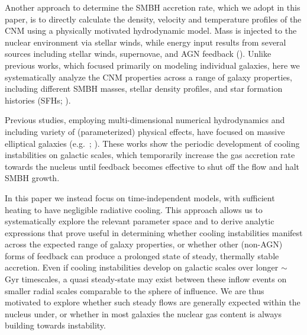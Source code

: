 \documentclass[usenatbib,fleqn]{mn2e}
\begin{document}

Another approach to determine the SMBH accretion rate, which we adopt
in this paper, is to directly calculate the density, velocity and
temperature profiles of the CNM using a physically motivated
hydrodynamic model.  Mass is injected to the nuclear environment via
stellar winds, while energy input results from several sources
including stellar winds, supernovae, and AGN feedback
(\citealt{Quataert:2004a,De-ColleGuillochon+:2012a,ShcherbakovWong+:2014a}).
Unlike previous works, which focused primarily on modeling individual galaxies, here
we systematically analyze the CNM properties across a range of galaxy properties, including different SMBH masses, stellar density profiles, and
star formation histories (SFHs; \citealt{WangMerritt:2004a}).

Previous studies, employing multi-dimensional numerical hydrodynamics and
including variety of (parameterized) physical effects, have focused on
massive elliptical galaxies (e.g.~\citealt{Ciotti&Ostriker07};
\citealt{Ciotti+10}).  These works show the periodic
development of cooling instabilities on galactic scales, which
temporarily increase the gas accretion rate towards the nucleus until
feedback becomes effective to shut off the flow and halt
SMBH growth.  

In this paper we instead focus on time-independent models, with
sufficient heating to have negligible radiative cooling.  This
approach allows us to systematically explore the relevant parameter
space and to derive analytic expressions that prove useful in
determining whether cooling instabilities manifest across the expected
range of galaxy properties, or whether other (non-AGN) forms of
feedback can produce a prolonged state of steady, thermally stable
accretion.  Even if cooling instabilities develop on galactic scales
over longer $\sim$ Gyr timescales, a quasi steady-state may exist
between these inflow events on smaller radial scales comparable to the
sphere of influence.  We are thus motivated to explore whether such
steady flows are generally expected within the nucleus under, or
whether in most galaxies the nuclear gas content is always building
towards instability.
\end{document}
